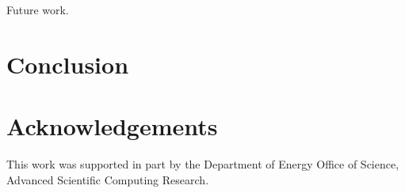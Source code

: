 \documentclass{acm_proc_article-sp}
\begin{document}
Future work.

\section{Conclusion}

\section{Acknowledgements}

This work was supported in part by the Department of Energy Office of Science,
Advanced Scientific Computing Research.

% 



\end{document}

